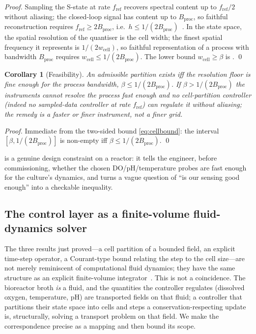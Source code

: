\documentclass[11pt,a4paper,twocolumn]{article}
\theoremstyle{thmstyle}
\newtheorem{corollary}[theorem]{Corollary}
\theoremstyle{definition}
\theoremstyle{remark}
\newcommand{\wcell}{w_{\mathrm{cell}}}
\newcommand{\floor}{\beta}
\newcommand{\Bproc}{B_{\mathrm{proc}}}
\newcommand{\fref}{f_{\mathrm{ref}}}
\begin{document}
\begin{proof}
Sampling the S-state at rate $\fref$ recovers spectral content up to
$\fref/2$ without aliasing; the closed-loop signal has content up to
$\Bproc$, so faithful reconstruction requires $\fref\ge2\Bproc$, i.e.\
$h\le1/(2\Bproc)$~\citep{shannon1948mathematical,astrom2008feedback}. In
the state space, the spatial resolution of the quantiser is the cell
width; the finest spatial frequency it represents is $1/(2\wcell)$, so
faithful representation of a process with bandwidth $\Bproc$ requires
$\wcell\le1/(2\Bproc)$. The lower bound $\wcell\ge\floor$ is
. \qed
\end{proof}

\begin{corollary}[Feasibility]
\label{cor:feasible}
An admissible partition exists iff the resolution floor is fine enough
for the process bandwidth, $\floor\le1/(2\Bproc)$. If
$\floor>1/(2\Bproc)$ the instruments cannot resolve the process fast
enough and no cell-partition controller (indeed no sampled-data
controller at rate $\fref$) can regulate it without aliasing; the remedy
is a faster or finer instrument, not a finer grid.
\end{corollary}

\begin{proof}
Immediate from the two-sided bound \eqref{eq:cellbound}: the interval
$[\floor,1/(2\Bproc)]$ is non-empty iff $\floor\le1/(2\Bproc)$. \qed
\end{proof}

 is a genuine design constraint on a reactor: it tells
the engineer, before commissioning, whether the chosen DO/pH/temperature
probes are fast enough for the culture's dynamics, and turns a vague
question of ``is our sensing good enough'' into a checkable inequality.

\subsection{The control layer as a finite-volume fluid-dynamics solver}
\label{sec:fvm}

The three results just proved---a cell partition of a bounded field, an
explicit time-step operator, a Courant-type bound relating the step to the
cell size---are not merely reminiscent of computational fluid dynamics;
they have the same structure as an explicit finite-volume
integrator~\citep{astrom2008feedback}. This is not a coincidence. The
bioreactor broth \emph{is} a fluid, and the quantities the controller
regulates (dissolved oxygen, temperature, pH) are transported fields on
that fluid; a controller that partitions their state space into cells and
steps a conservation-respecting update is, structurally, solving a
transport problem on that field. We make the correspondence precise as a
mapping and then bound its scope.
\end{document}
